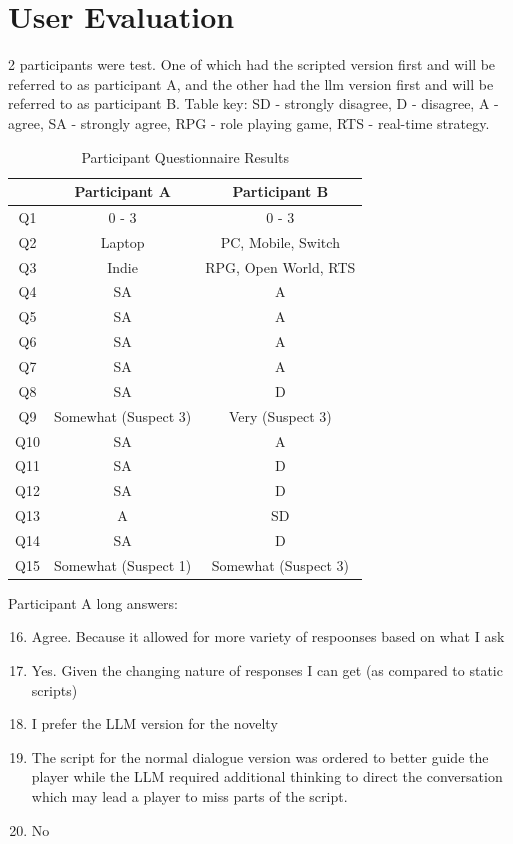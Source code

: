 \documentclass[12pt, a4paper]{report}
\begin{document}
	\section{User Evaluation}
	2 participants were test. One of which had the scripted version first and will be referred to as participant A, and the other had the \gls{llm} version first and will be referred to as participant B. Table key: SD - strongly disagree, D - disagree, A - agree, SA - strongly agree, RPG - role playing game, RTS - real-time strategy.
	
	\begin{table}[h!]
		\centering
		\begin{tabular}{|c|c|c|}
			\hline
			& Participant A & Participant B \\ \hline
			Q1 & 0 - 3 & 0 - 3 \\ \hline
			Q2 & Laptop & PC, Mobile, Switch \\ \hline
			Q3 & Indie & RPG, Open World, RTS \\ \hline
			Q4 & SA & A \\ \hline
			Q5 & SA & A \\ \hline
			Q6 & SA & A \\ \hline
			Q7 & SA & A \\ \hline
			Q8 & SA & D \\ \hline
			Q9 & Somewhat (Suspect 3) & Very (Suspect 3) \\ \hline
			Q10 & SA & A \\ \hline
			Q11 & SA & D \\ \hline
			Q12 & SA & D \\ \hline
			Q13 & A & SD \\ \hline
			Q14 & SA & D \\ \hline
			Q15 & Somewhat (Suspect 1) & Somewhat (Suspect 3) \\ \hline
		\end{tabular}
		\caption{Participant Questionnaire Results}
	\end{table}
	
	Participant A long answers:
	
	\begin{enumerate}
		\setcounter{enumi}{15}
		\item Agree. Because it allowed for more variety of respoonses based on what I ask
		\item Yes. Given the changing nature of responses I can get (as compared to static scripts)
		\item I prefer the LLM version for the novelty
		\item The script for the normal dialogue version was ordered to better guide the player while the LLM required additional thinking to direct the conversation which may lead a player to miss parts of the script.
		\item No
	\end{enumerate}
	
\end{document}
